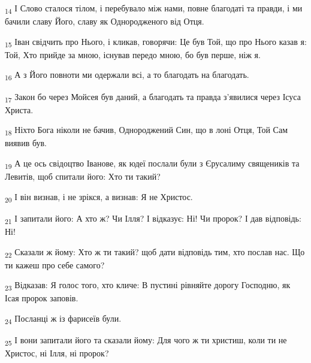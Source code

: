 \begin{tcolorbox}
\textsubscript{14} І Слово сталося тілом, і перебувало між нами, повне благодаті та правди, і ми бачили славу Його, славу як Однородженого від Отця.
\end{tcolorbox}
\begin{tcolorbox}
\textsubscript{15} Іван свідчить про Нього, і кликав, говорячи: Це був Той, що про Нього казав я: Той, Хто прийде за мною, існував передо мною, бо був перше, ніж я.
\end{tcolorbox}
\begin{tcolorbox}
\textsubscript{16} А з Його повноти ми одержали всі, а то благодать на благодать.
\end{tcolorbox}
\begin{tcolorbox}
\textsubscript{17} Закон бо через Мойсея був даний, а благодать та правда з'явилися через Ісуса Христа.
\end{tcolorbox}
\begin{tcolorbox}
\textsubscript{18} Ніхто Бога ніколи не бачив, Однороджений Син, що в лоні Отця, Той Сам виявив був.
\end{tcolorbox}
\begin{tcolorbox}
\textsubscript{19} А це ось свідоцтво Іванове, як юдеї послали були з Єрусалиму священиків та Левитів, щоб спитали його: Хто ти такий?
\end{tcolorbox}
\begin{tcolorbox}
\textsubscript{20} І він визнав, і не зрікся, а визнав: Я не Христос.
\end{tcolorbox}
\begin{tcolorbox}
\textsubscript{21} І запитали його: А хто ж? Чи Ілля? І відказує: Ні! Чи пророк? І дав відповідь: Ні!
\end{tcolorbox}
\begin{tcolorbox}
\textsubscript{22} Сказали ж йому: Хто ж ти такий? щоб дати відповідь тим, хто послав нас. Що ти кажеш про себе самого?
\end{tcolorbox}
\begin{tcolorbox}
\textsubscript{23} Відказав: Я голос того, хто кличе: В пустині рівняйте дорогу Господню, як Ісая пророк заповів.
\end{tcolorbox}
\begin{tcolorbox}
\textsubscript{24} Посланці ж із фарисеїв були.
\end{tcolorbox}
\begin{tcolorbox}
\textsubscript{25} І вони запитали його та сказали йому: Для чого ж ти христиш, коли ти не Христос, ні Ілля, ні пророк?
\end{tcolorbox}
